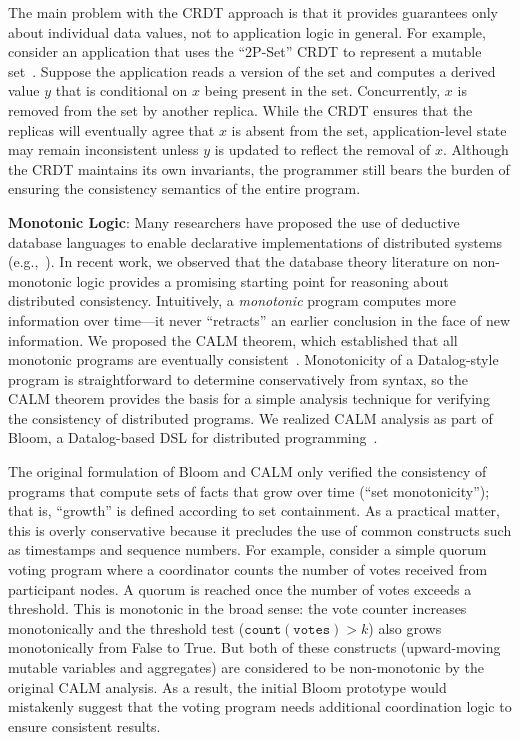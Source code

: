 The main problem with the CRDT approach is that it provides guarantees only
about individual data values, not to application logic in general. For example,
consider an application that uses the ``2P-Set'' CRDT to represent a mutable
set~\cite{Shapiro2011a}. Suppose the application reads a version of the set and
computes a derived value $y$ that is conditional on $x$ being present in the
set. Concurrently, $x$ is removed from the set by another replica. While the
CRDT ensures that the replicas will eventually agree that $x$ is absent from the
set, application-level state may remain inconsistent unless $y$ is updated to
reflect the removal of $x$. Although the CRDT maintains its own invariants, the
programmer still bears the burden of ensuring the consistency semantics of the
entire program.

\vspace{0.5em} \noindent
\textbf{Monotonic Logic}: Many researchers have proposed the use of deductive
database languages to enable declarative implementations of distributed systems
(e.g.,~\cite{Abiteboul2011,Alvaro2010,Field2009}). In recent work, we observed
that the database theory literature on non-monotonic logic provides a promising
starting point for reasoning about distributed consistency. Intuitively, a
\emph{monotonic} program computes more information over time---it never
``retracts'' an earlier conclusion in the face of new information. We proposed
the CALM theorem, which established that all monotonic programs are eventually
consistent~\cite{Ameloot2011,Hellerstein2010,dedalus-pods12-tr}. Monotonicity of
a Datalog-style program is straightforward to determine conservatively from
syntax, so the CALM theorem provides the basis for a simple analysis technique
for verifying the consistency of distributed programs. We realized CALM analysis
as part of Bloom, a Datalog-based DSL for distributed
programming~\cite{Alvaro2011,bloom}.

The original formulation of Bloom and CALM only verified the consistency of
programs that compute sets of facts that grow over time (``set monotonicity'');
that is, ``growth'' is defined according to set containment. As a practical
matter, this is overly conservative because it precludes the use of common
constructs such as timestamps and sequence numbers. For example, consider a
simple quorum voting program where a coordinator counts the number of votes
received from participant nodes. A quorum is reached once the number of votes
exceeds a threshold. This is monotonic in the broad sense: the vote counter
increases monotonically and the threshold test ($\mathtt{count(votes)} > k$)
also grows monotonically from False to True. But both of these constructs
(upward-moving mutable variables and aggregates) are considered to be
non-monotonic by the original CALM analysis.  As a result, the initial Bloom
prototype would mistakenly suggest that the voting program needs additional
coordination logic to ensure consistent results.

